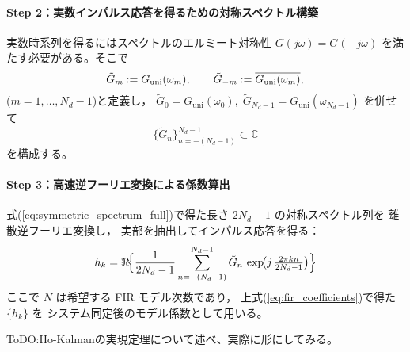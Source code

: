 \paragraph{Step 2：実数インパルス応答を得るための対称スペクトル構築}
実数時系列を得るにはスペクトルのエルミート対称性
\(
  \overline{G(j\omega)}=G(-j\omega)
\)
を満たす必要がある。そこで
{\small
\begin{equation}
  \label{eq:symmetric_spectrum}
  \tilde{G}_{m}
  :=G_{\mathrm{uni}}(\omega_m),
  \qquad
  \tilde{G}_{-m}
  :=\overline{G_{\mathrm{uni}}(\omega_m)}, \\
\end{equation}
}
(\(m=1,\dots,N_d-1\))と定義し，
\(
  \tilde{G}_{0}=G_{\mathrm{uni}}(\omega_0),\;
  \tilde{G}_{N_d-1}=G_{\mathrm{uni}}(\omega_{N_d-1})
\)
を併せて
{\small
\begin{equation}
  \label{eq:symmetric_spectrum_full}
  \{\tilde{G}_{n}\}_{n=-(N_d-1)}^{N_d-1}
  \subset\mathbb{C}
\end{equation}
}
を構成する。

\paragraph{Step 3：高速逆フーリエ変換による係数算出}
式(\ref{eq:symmetric_spectrum_full})で得た長さ \(2N_d-1\) の対称スペクトル列を
離散逆フーリエ変換し，
実部を抽出してインパルス応答を得る：
{\small
\begin{equation}
  \label{eq:fir_coefficients}
  h_k
  =\Re\!\Bigl\{
        \frac{1}{2N_d-1}
        \sum_{n=-(N_d-1)}^{N_d-1}
        \tilde{G}_{n}\,
        \exp\!\bigl(j\,\tfrac{2\pi k n}{2N_d-1}\bigr)
      \Bigr\}
\end{equation}
}
ここで \(N\) は希望する FIR モデル次数であり，
上式(\ref{eq:fir_coefficients})で得た \(\{h_k\}\) を
システム同定後のモデル係数として用いる。

ToDO:Ho-Kalmanの実現定理について述べ、実際に形にしてみる。